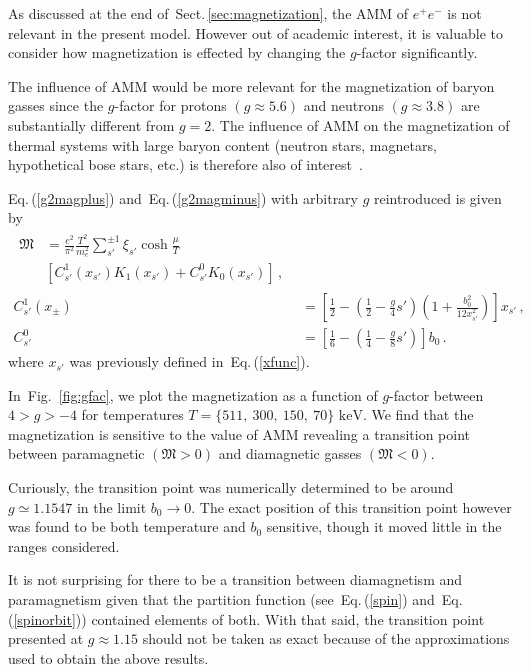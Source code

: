 \documentclass[aps,prd,floatfix,reprint]{revtex4-2}
\newcommand*{\keV}{\text{ keV}}
\newcommand{\req}[1]{Eq.\,(\ref{#1})}
\newcommand{\rf}[1]{Fig.~{\ref{#1}}}
\newcommand{\rsec}[1]{Sect.\,{\ref{#1}}}
\begin{document}
\noindent As discussed at the end of~\rsec{sec:magnetization}, the AMM of $e^{+}e^{-}$ is not relevant in the present model. However out of academic interest, it is valuable to consider how magnetization is effected by changing the $g$-factor significantly.

The influence of AMM would be more relevant for the magnetization of baryon gasses since the $g$-factor for protons $(g\approx5.6)$ and neutrons $(g\approx3.8)$ are substantially different from $g=2$. The influence of AMM on the magnetization of thermal systems with large baryon content (neutron stars, magnetars, hypothetical bose stars, etc.) is therefore also of interest~\cite{Ferrer:2019xlr,Ferrer:2023pgq}.

\req{g2magplus} and~\req{g2magminus} with arbitrary $g$ reintroduced is given by
\begin{align}
\begin{split}
\label{arbg:1}
{\mathfrak M}&=\frac{e^{2}}{\pi^{2}}\frac{T^{2}}{m_{e}^{2}}\sum_{s'}^{\pm1}\xi_{s'}\cosh{\frac{\mu}{T}}\\
&\left[C^{1}_{s'}(x_{s'})K_{1}(x_{s'})+C^{0}_{s'}K_{0}(x_{s'})\right]\,,
\end{split}\\
\label{arbg:2}
C^{1}_{s'}(x_{\pm}) &= \left[\frac{1}{2}-\left(\frac{1}{2}-\frac{g}{4}s'\right)\left(1+\frac{b^2_0}{12x^{2}_{s'}}\right)\right]x_{s'}\,,\\
C^{0}_{s'} &= \left[\frac{1}{6}-\left(\frac{1}{4}-\frac{g}{8}s'\right)\right]b_0\,.
\end{align}
where $x_{s'}$ was previously defined in~\req{xfunc}.

In~\rf{fig:gfac}, we plot the magnetization as a function of $g$-factor between $4>g>-4$ for temperatures $T=\{511,\ 300,\ 150,\ 70\}\keV$. We find that the magnetization is sensitive to the value of AMM revealing a transition point between paramagnetic $({\mathfrak M}>0)$ and diamagnetic gasses $({\mathfrak M}<0)$. 

Curiously, the transition point was numerically determined to be around $g\simeq1.1547$ in the limit $b_{0}\rightarrow0$. The exact position of this transition point however was found to be both temperature and $b_{0}$ sensitive, though it moved little in the ranges considered.

It is not surprising for there to be a transition between diamagnetism and paramagnetism given that the partition function (see~\req{spin} and~\req{spinorbit}) contained elements of both. With that said, the transition point presented at $g\approx1.15$ should not be taken as exact because of the approximations used to obtain the above results. 
\end{document}
